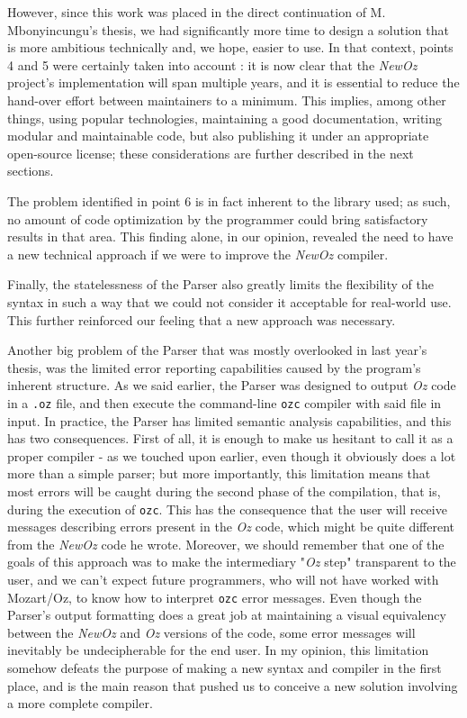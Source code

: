 However, since this work was placed in the direct continuation of M. Mbonyincungu's thesis, we had significantly more time to design a solution that is more ambitious technically and, we hope, easier to use.
In that context, points 4 and 5 were certainly taken into account : it is now clear that the \textit{NewOz} project's implementation will span multiple years, and it is essential to reduce the hand-over effort between maintainers to a minimum.
This implies, among other things, using popular technologies, maintaining a good documentation, writing modular and maintainable code, but also publishing it under an appropriate open-source license;
these considerations are further described in the next sections.\newline

The problem identified in point 6 is in fact inherent to the library used;
as such, no amount of code optimization by the programmer could bring satisfactory results in that area.
This finding alone, in our opinion, revealed the need to have a new technical approach if we were to improve the \textit{NewOz} compiler.\newline

Finally, the statelessness of the Parser also greatly limits the flexibility of the syntax in such a way that we could not consider it acceptable for real-world use.
This further reinforced our feeling that a new approach was necessary.\newline

Another big problem of the Parser that was mostly overlooked in last year's thesis, was the limited error reporting capabilities caused by the program's inherent structure.
As we said earlier, the Parser was designed to output \textit{Oz} code in a \texttt{.oz} file, and then execute the command-line \texttt{ozc} compiler with said file in input.
In practice, the Parser has limited semantic analysis capabilities, and this has two consequences.
First of all, it is enough to make us hesitant to call it as a proper compiler - as we touched upon earlier, even though it obviously does a lot more than a simple parser;
but more importantly, this limitation means that most errors will be caught during the second phase of the compilation, that is, during the execution of \texttt{ozc}.
This has the consequence that the user will receive messages describing errors present in the \textit{Oz} code, which might be quite different from the \textit{NewOz} code he wrote.
Moreover, we should remember that one of the goals of this approach was to make the intermediary "\textit{Oz} step" transparent to the user, and we can't expect future programmers, who will not have worked with Mozart/Oz, to know how to interpret \texttt{ozc} error messages.
Even though the Parser's output formatting does a great job at maintaining a visual equivalency between the \textit{NewOz} and \textit{Oz} versions of the code, some error messages will inevitably be undecipherable for the end user.
In my opinion, this limitation somehow defeats the purpose of making a new syntax and compiler in the first place, and is the main reason that pushed us to conceive a new solution involving a more complete compiler.

